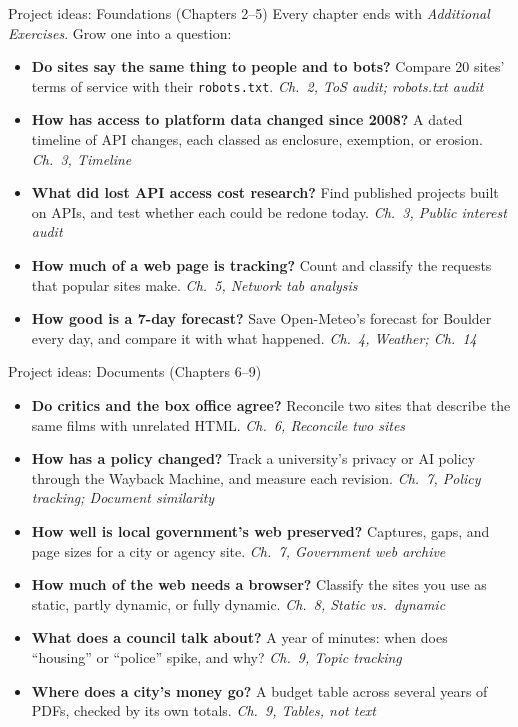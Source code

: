 \documentclass[9pt,aspectratio=169]{beamer}
\begin{document}
\begin{frame}{Project ideas: Foundations (Chapters 2--5)}
    Every chapter ends with \textit{Additional Exercises}. Grow one into a question:
    \begin{itemize}\small
        \item \textbf{Do sites say the same thing to people and to bots?} Compare 20 sites' terms of service with their \texttt{robots.txt}. \hfill \textit{Ch.~2, ToS audit; robots.txt audit}
        \item \textbf{How has access to platform data changed since 2008?} A dated timeline of API changes, each classed as enclosure, exemption, or erosion. \hfill \textit{Ch.~3, Timeline}
        \item \textbf{What did lost API access cost research?} Find published projects built on APIs, and test whether each could be redone today. \hfill \textit{Ch.~3, Public interest audit}
        \item \textbf{How much of a web page is tracking?} Count and classify the requests that popular sites make. \hfill \textit{Ch.~5, Network tab analysis}
        \item \textbf{How good is a 7-day forecast?} Save Open-Meteo's forecast for Boulder every day, and compare it with what happened. \hfill \textit{Ch.~4, Weather; Ch.~14}
    \end{itemize}
\end{frame}

\begin{frame}{Project ideas: Documents (Chapters 6--9)}
    \begin{itemize}\small
        \item \textbf{Do critics and the box office agree?} Reconcile two sites that describe the same films with unrelated HTML. \hfill \textit{Ch.~6, Reconcile two sites}
        \item \textbf{How has a policy changed?} Track a university's privacy or AI policy through the Wayback Machine, and measure each revision. \hfill \textit{Ch.~7, Policy tracking; Document similarity}
        \item \textbf{How well is local government's web preserved?} Captures, gaps, and page sizes for a city or agency site. \hfill \textit{Ch.~7, Government web archive}
        \item \textbf{How much of the web needs a browser?} Classify the sites you use as static, partly dynamic, or fully dynamic. \hfill \textit{Ch.~8, Static vs.\ dynamic}
        \item \textbf{What does a council talk about?} A year of minutes: when does ``housing'' or ``police'' spike, and why? \hfill \textit{Ch.~9, Topic tracking}
        \item \textbf{Where does a city's money go?} A budget table across several years of PDFs, checked by its own totals. \hfill \textit{Ch.~9, Tables, not text}
    \end{itemize}
\end{frame}
\end{document}
